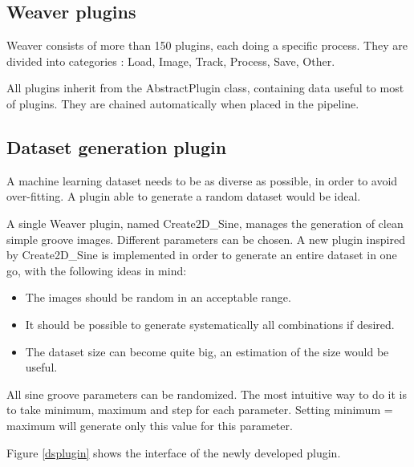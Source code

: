 \documentclass[12pt, twoside]{article}
\begin{document}
\subsection{Weaver plugins}
Weaver consists of more than 150 plugins, each doing a specific process. They are divided into categories : Load, Image, Track, Process, Save, Other.

All plugins inherit from the AbstractPlugin class, containing data useful to most of plugins. They are chained automatically when placed in the pipeline. 
\subsection{Dataset generation plugin}
A machine learning dataset needs to be as diverse as possible, in order to avoid over-fitting. A plugin able to generate a random dataset would be ideal.

A single Weaver plugin, named Create2D\_Sine, manages the generation of clean simple groove images. Different parameters can be chosen. A new plugin inspired by Create2D\_Sine is implemented in order to generate an entire dataset in one go, with the following ideas in mind:
\begin{itemize}
	\item The images should be random in an acceptable range.
	\item It should be possible to generate systematically all combinations if desired.
	\item The dataset size can become quite big, an estimation of the size would be useful.
\end{itemize}

All sine groove parameters can be randomized. The most intuitive way to do it is to take minimum, maximum and step for each parameter. Setting minimum = maximum will generate only this value for this parameter.

Figure \ref{dsplugin} shows the interface of the newly developed plugin.
\end{document}
